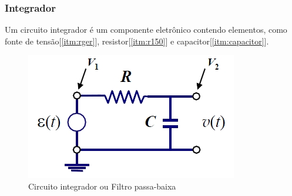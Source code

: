 \documentclass[12pt,letterpaper]{article}
\begin{document}
\subsubsection{Integrador}
Um circuito integrador é um componente eletrônico contendo elementos, como fonte de tensão[\ref{itm:rger}], resistor[\ref{itm:r150}] e capacitor[\ref{itm:capacitor}].
\begin{figure}[!htb]
  \centering
  \label{imgint}
  \includegraphics[scale=0.5]{integrador.jpg}
  \caption{Circuito integrador ou Filtro passa-baixa}
\end{figure}
\end{document}
